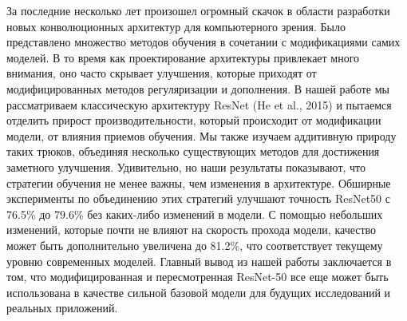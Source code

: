 
За последние несколько лет произошел огромный скачок в области разработки новых конволюционных архитектур для компьютерного зрения. Было представлено множество методов обучения в сочетании с модификациями самих моделей. В то время как проектирование архитектуры привлекает много внимания, оно часто скрывает улучшения, которые приходят от модифицированных методов регуляризации и дополнения. В нашей работе мы рассматриваем классическую архитектуру ResNet (He et al., 2015) и пытаемся отделить прирост производительности, который происходит от модификации модели, от влияния приемов обучения. Мы также изучаем аддитивную природу таких трюков, объединяя несколько существующих методов для достижения заметного улучшения. Удивительно, но наши результаты показывают, что стратегии обучения не менее важны, чем изменения в архитектуре. Обширные эксперименты по объединению этих стратегий улучшают точность ResNet50 с 76.5\% до 79.6\% без каких-либо изменений в модели. С помощью небольших изменений, которые почти не влияют на скорость прохода модели, качество может быть дополнительно увеличена до 81.2\%, что соответствует текущему уровню современных моделей. Главный вывод из нашей работы заключается в том, что модифицированная и пересмотренная ResNet-50 все еще может быть использована в качестве сильной базовой модели для будущих исследований и реальных приложений.
